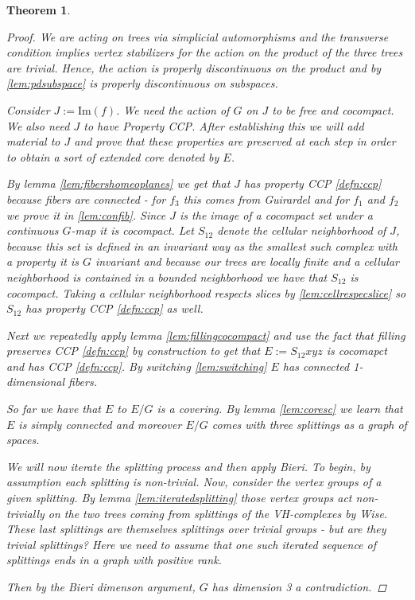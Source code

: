 \documentclass{article}
\theoremstyle{mystyle}
\newtheorem{thm}{Theorem}[section]
\theoremstyle{remark}
\begin{document}
\begin{thm}
\begin{proof}
  We are acting on trees via simplicial automorphisms and the transverse condition implies vertex stabilizers for the action on the product of the three trees are trivial. Hence, the action is properly discontinuous on the product and by \ref{lem:pdsubspace} is properly discontinuous on subspaces.

        Consider \(J := \text{Im}(f)\). We need the action of $G$ on $J$ to be free and cocompact. We also need $J$ to have Property CCP. After establishing this we will add material to $J$ and prove that these properties are preserved at each step in order to obtain a sort of extended core denoted by $E$.
        
      
        
        By lemma \ref{lem:fibershomeoplanes} we get that \(J\) has property CCP \ref{defn:ccp} because fibers are connected - for $f_3$ this comes from Guirardel and for $f_1$ and $f_2$ we prove it in \ref{lem:confib}. Since \(J\) is the image of a cocompact set under a continuous \(G\)-map it is cocompact. Let \(S_{12}\) denote the cellular neighborhood of \(J\), because this set is defined in an invariant way as the smallest such complex with a property it is \(G\) invariant and because our trees are locally finite and a cellular neighborhood is contained in a bounded neighborhood we have that \(S_{12}\) is cocompact. Taking a cellular neighborhood respects slices by \ref{lem:cellrespecslice}  so \(S_{12}\) has property CCP \ref{defn:ccp} as well.

        Next we repeatedly apply lemma \ref{lem:fillingcocompact} and use the fact that filling preserves CCP \ref{defn:ccp} by construction to get that \(E:= S_{12}xyz\) is cocomapct and has CCP \ref{defn:ccp}. By switching \ref{lem:switching} \(E\) has connected 1-dimensional fibers. 

        So far we have that $E$ to $E/G$ is a covering. By lemma \ref{lem:coresc} we learn that \(E\) is simply connected and moreover \(E/G\) comes with three splittings as a graph of spaces.

        We will now iterate the splitting process and then apply Bieri. To begin, by assumption each splitting is non-trivial. Now, consider the vertex groups of a given splitting. By lemma \ref{lem:iteratedsplitting} those vertex groups act non-trivially on the two trees coming from splittings of the VH-complexes by Wise. These last splittings are themselves splittings over trivial groups - but are they trivial splittings? Here we need to assume that one such iterated sequence of splittings ends in a graph with positive rank.
        
        Then by the Bieri dimenson argument, \(G\) has dimension 3 a contradiction.
    \end{proof}
\end{thm}
\end{document}
